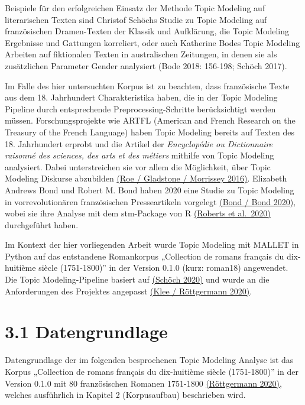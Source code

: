 \documentclass[
  12pt,
  letterpaper,
  DIV=11,
  numbers=noendperiod]{scrreprt}
\begin{document}
Beispiele für den erfolgreichen Einsatz der Methode Topic Modeling auf
literarischen Texten sind Christof Schöchs Studie zu Topic Modeling auf
französischen Dramen-Texten der Klassik und Aufklärung, die Topic
Modeling Ergebnisse und Gattungen korreliert, oder auch Katherine Bodes
Topic Modeling Arbeiten auf fiktionalen Texten in australischen
Zeitungen, in denen sie als zusätzlichen Parameter Gender analysiert
(Bode 2018: 156-198; Schöch 2017).

Im Falle des hier untersuchten Korpus ist zu beachten, dass französische
Texte aus dem 18. Jahrhundert Charakteristika haben, die in der Topic
Modeling Pipeline durch entsprechende Preprocessing-Schritte
berücksichtigt werden müssen. Forschungsprojekte wie ARTFL (American and
French Research on the Treasury of the French Language) haben Topic
Modeling bereits auf Texten des 18. Jahrhundert erprobt und die Artikel
der \emph{Encyclopédie ou Dictionnaire raisonné des sciences, des arts
et des métiers} mithilfe von Topic Modeling analysiert. Dabei
unterstreichen sie vor allem die Möglichkeit, über Topic Modeling
Diskurse abzubilden
\href{https://www.zotero.org/google-docs/?vzti7Y}{(Roe / Gladstone /
Morrissey 2016)}. Elizabeth Andrews Bond und Robert M. Bond haben 2020
eine Studie zu Topic Modeling in vorrevolutionären französischen
Presseartikeln vorgelegt
\href{https://www.zotero.org/google-docs/?bxYeLA}{(Bond / Bond 2020)},
wobei sie ihre Analyse mit dem stm-Package von R
\href{https://www.zotero.org/google-docs/?630zS4}{(Roberts et al.~2020)}
durchgeführt haben.

Im Kontext der hier vorliegenden Arbeit wurde Topic Modeling mit MALLET
in Python auf das entstandene Romankorpus „Collection de romans français
du dix-huitième siècle (1751-1800)'' in der Version 0.1.0 (kurz:
roman18) angewendet. Die Topic Modeling-Pipeline basiert auf
\href{https://www.zotero.org/google-docs/?0XjOWr}{(Schöch 2020)} und
wurde an die Anforderungen des Projektes angepasst
\href{https://www.zotero.org/google-docs/?r1rjjV}{(Klee / Röttgermann
2020)}.


\chapter{3.1 Datengrundlage}\label{datengrundlage}

Datengrundlage der im folgenden besprochenen Topic Modeling Analyse ist
das Korpus „Collection de romans français du dix-huitième siècle
(1751-1800)'' in der Version 0.1.0 mit 80 französischen Romanen
1751-1800 \href{https://www.zotero.org/google-docs/?PJucQ2}{(Röttgermann
2020)}, welches ausführlich in Kapitel 2 (Korpusaufbau) beschrieben
wird.
\end{document}
